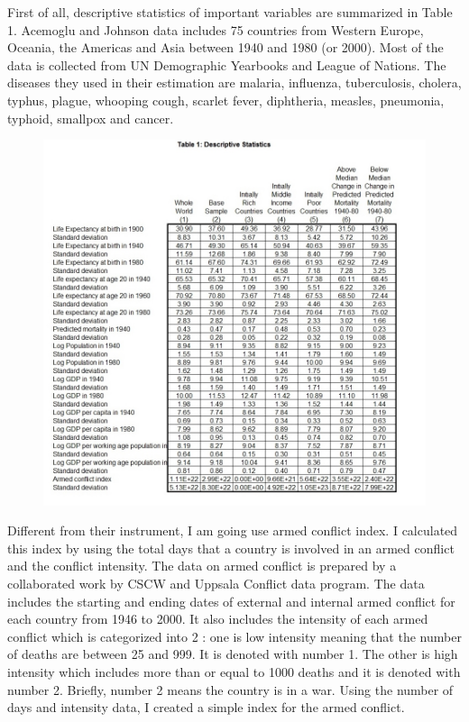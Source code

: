 \documentclass[11pt]{article}
\begin{document}
First of all, descriptive statistics of important variables are summarized in  Table 1. Acemoglu and Johnson data includes 75 countries from Western Europe, Oceania, the Americas and Asia between 1940 and 1980 (or 2000). Most of the data is collected from UN Demographic Yearbooks and League of Nations. The diseases they used in their estimation are malaria, influenza, tuberculosis, cholera, typhus, plague, whooping cough, scarlet fever, diphtheria, measles, pneumonia, typhoid, smallpox and cancer.
\begin{figure} [H]
\centering
\includegraphics[width = \textwidth]{ds}
\label{table1}
\end{figure}
Different from their instrument, I am going use armed conflict index. I calculated this index by using the total days that a country is involved in an armed conflict and the conflict intensity. The data on armed conflict is prepared by a collaborated work by CSCW and Uppsala Conflict data program. The data includes the starting and ending dates of external and internal armed conflict for each country from 1946 to 2000. It also includes the intensity of each armed conflict which is categorized into 2 : one is low intensity meaning that the number of deaths are between 25 and 999. It is denoted with number 1. The other is high intensity which includes more than or equal to 1000 deaths and it is denoted with number 2. Briefly, number 2 means the country is in a war. Using the number of days and intensity data, I created a simple index for the armed conflict. 
\end{document}
